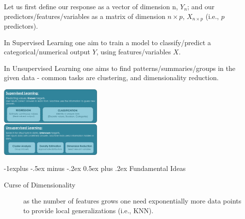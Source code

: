 \documentclass[10pt,landscape]{article}
\makeatletter
\renewcommand{\subsection}{\@startsection{subsection}{2}{0mm}%
                                {-1explus -.5ex minus -.2ex}%
                                {0.5ex plus .2ex}%
                                {\normalfont\normalsize\bfseries}}
\makeatother
\begin{document}
\begin{multicols*}{3}
    Let us first define our response as a vector of dimension n, $Y_n$; and
    our predictors/features/variables as a matrix of dimension $n \times p$,
    $X_{n\times p}$ (i.e., $p$ predictors).

    In Supervised Learning one aim to train a model to classify/predict
    a categorical/numerical output $Y$, using features/variables $X$.

    In Unsupervised Learning one aims to find patterns/summaries/groups
    in the given data - common tasks are clustering,
    and dimensionality reduction.

    \begin{minipage}{\linewidth}
            \centering
            \includegraphics[width=2in]{figures/learn_methods_summary.png}
    \end{minipage}

    \subsection{Fundamental Ideas}

    \begin{description}
        \item[Curse of Dimensionality] as the number of features grows one need exponentially more
        data points to provide local generalizations (i.e., KNN).


\end{description}
\end{multicols*}
\end{document}
